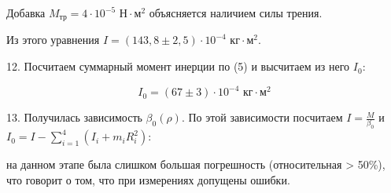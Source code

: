 Добавка $M_\text{тр} = 4 \cdot 10^{-5} \text{ Н} \cdot \text{м}^2$ объясняется наличием силы трения.

Из этого уравнения $I = (143,8 \pm 2,5) \cdot 10^{-4} \text{ кг} \cdot \text{м}^2$.

12. Посчитаем суммарный момент инерции по (5) и высчитаем из него $I_0$:

\[I_0 = (67 \pm 3) \cdot 10^{-4} \text{ кг} \cdot \text{м}^2\]

13. Получилась зависимость $\beta_0(\rho)$. По этой зависимости посчитаем
$I = \frac{M}{\beta_0}$ и $I_0 = I - \sum_{i = 1}^{4}\left(I_i + m_i R_i^2\right)$:

на данном этапе была слишком большая погрешность (относительная > 50\%), что говорит о том, что при измерениях допущены ошибки.
